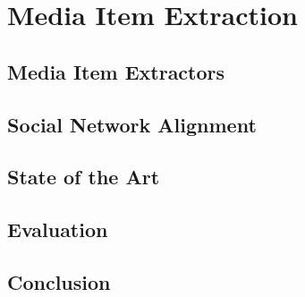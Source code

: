 

\chapter{Media Item Extraction}

\ifpdf
    \graphicspath{{5_media_item_extraction/figures/PNG/}{5_media_item_extraction/figures/PDF/}{5_media_item_extraction/figures/}}
\else
    \graphicspath{{5_media_item_extraction/figures/EPS/}{5_media_item_extraction/figures/}}
\fi


\section{Media Item Extractors}

\section{Social Network Alignment}

\section{State of the Art}

\section{Evaluation}

\section{Conclusion}